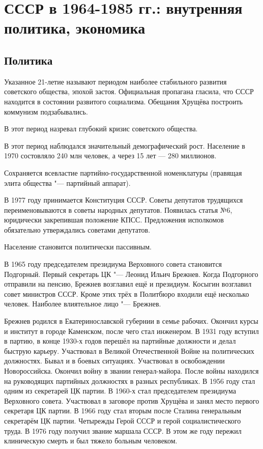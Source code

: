 \documentclass{article}
\begin{document}
\section{СССР в 1964-1985 гг.: внутренняя политика, экономика}
\subsection{Политика}
Указанное 21-летие называют периодом наиболее стабильного развития советского общества, эпохой застоя. Официальная пропагана гласила, что СССР находится в состоянии развитого социализма. Обещания Хрущёва построить коммунизм подзабывались.

В этот период назревал глубокий кризис советского общества.

В этот период наблюдался значительный демографический рост. Население в 1970 состовляло 240 млн человек, а через 15 лет --- 280 миллионов.

Сохраняется всевластие партийно-государственной номенклатуры (правящая элита общества "--- партийный аппарат).

В 1977 году принимается Конституция СССР. Советы депутатов трудящихся переименовываются в советы народных депутатов. Появилась статья №6, юридически закрепившая положение КПСС. Предложения исполкомов обязательно утверждались советами депутатов.

Население становится политически пассивным.

В 1965 году председателем президиума Верховного совета становится Подгорный. Первый секретарь ЦК "--- Леонид Ильич Брежнев. Когда Подгорного отправили на пенсию, Брежнев возглавил ещё и президиум. Косыгин возглавил совет министров СССР. Кроме этих трёх в Политбюро входили ещё несколько человек. Наиболее влиятельное лицо "--- Брежнев.

Брежнев родился в Екатеринославской губернии в семье рабочих. Окончил курсы и институт в городе Каменском, после чего стал инженером. В 1931 году вступил в партию, в конце 1930-х годов перешёл на партийные должности и делал быструю карьеру. Участвовал в Великой Отечественной Войне на политических должностях. Бывал и в боевых ситуациях. Участвовал в освобождении Новороссийска. Окончил войну в звании генерал-майора. После войны находился на руководящих партийных должностях в разных республиках. В 1956 году стал одним из секретарей ЦК партии. В 1960-х стал председателем президиума Верховного совета. Участвовал в заговоре против Хрущёва и занял место первого секретаря ЦК партии. В 1966 году стал вторым после Сталина генеральным секретарём ЦК партии. Четырежды Герой СССР и герой социалистического труда. В 1976 году получил звание маршала СССР. В этом же году пережил клиническую смерть и был тяжело больным человеком.
\end{document}
